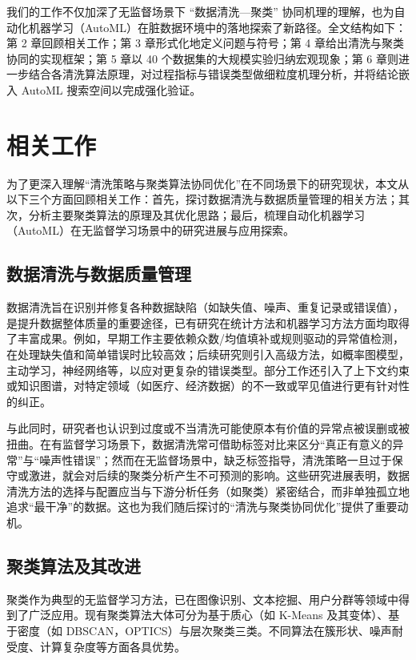 \documentclass[10pt]{article} %
\numberwithin{equation}{section}
\begin{document}
\textcolor[rgb]{0.00,0.07,1.00}{
我们的工作不仅加深了无监督场景下 “数据清洗—聚类” 协同机理的理解，也为自动化机器学习（AutoML）在脏数据环境中的落地探索了新路径。全文结构如下：第 2 章回顾相关工作；第 3 章形式化地定义问题与符号；第 4 章给出清洗与聚类协同的实现框架；第 5 章以 40 个数据集的大规模实验归纳宏观现象；第 6 章则进一步结合各清洗算法原理，对过程指标与错误类型做细粒度机理分析，并将结论嵌入 AutoML 搜索空间以完成强化验证。}



\section{相关工作}\label{sec:related_work}

为了更深入理解“清洗策略与聚类算法协同优化”在不同场景下的研究现状，本文从以下三个方面回顾相关工作：首先，探讨数据清洗与数据质量管理的相关方法；其次，分析主要聚类算法的原理及其优化思路；最后，梳理自动化机器学习（AutoML）在无监督学习场景中的研究进展与应用探索。

\subsection{数据清洗与数据质量管理}
数据清洗旨在识别并修复各种数据缺陷（如缺失值、噪声、重复记录或错误值），是提升数据整体质量的重要途径，已有研究在统计方法和机器学习方法方面均取得了丰富成果。例如，早期工作主要依赖众数/均值填补\cite{10.1093/bioinformatics/btr597}或规则驱动的异常值检测\cite{6544854, 5767833}，在处理缺失值和简单错误时比较高效；后续研究则引入高级方法，如概率图模型\cite{9151362}，主动学习\cite{10.14778/2994509.2994514, 10.1145/3357384.3358129}，神经网络\cite{Krishnan2017}等，以应对更复杂的错误类型。部分工作还引入了上下文约束或知识图谱\cite{6544847,10.14778/3407790.3407801}，对特定领域（如医疗、经济数据）的不一致或罕见值进行更有针对性的纠正。

与此同时，研究者也认识到过度或不当清洗可能使原本有价值的异常点被误删或被扭曲\cite{Ni2023}。在有监督学习场景下，数据清洗常可借助标签对比来区分“真正有意义的异常”与“噪声性错误”\cite{Bernhardt2022}；然而在无监督场景中，缺乏标签指导，清洗策略一旦过于保守或激进，就会对后续的聚类分析产生不可预测的影响。这些研究进展表明，数据清洗方法的选择与配置应当与下游分析任务（如聚类）紧密结合，而非单独孤立地追求“最干净”的数据\cite{Hu2017}。这也为我们随后探讨的“清洗与聚类协同优化”提供了重要动机。

\subsection{聚类算法及其改进}
聚类作为典型的无监督学习方法，已在图像识别、文本挖掘、用户分群等领域中得到了广泛应用。现有聚类算法大体可分为基于质心（如 K-Means 及其变体\cite{Bandyapadhyay2024, HUANG2021107996, IKOTUN2023178}）、基于密度（如 DBSCAN\cite{Abdulhameed2024, CHENG2024120731}，OPTICS\cite{HAJIHOSSEINLOU2024126094, 10.3233/IDA-205497, KAMIL20232625}）与层次聚类\cite{CHEN2025125714}三类。不同算法在簇形状、噪声耐受度、计算复杂度等方面各具优势\cite{SINGH2024102799}。
\end{document}
